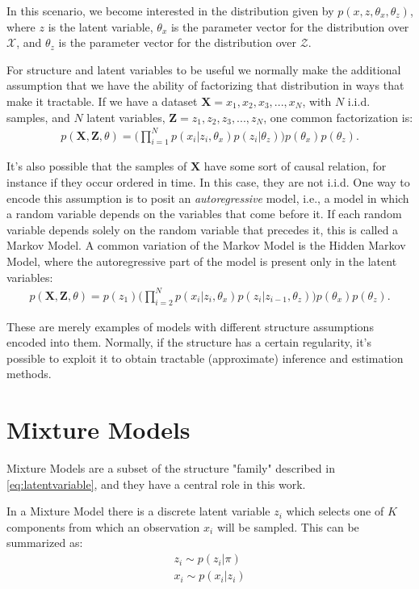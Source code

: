 In this scenario, we become interested in the distribution given by
$p(x, z, \theta_x, \theta_z)$, where $z$ is the latent variable, $\theta_x$ is
the parameter vector for the distribution over $\mathcal{X}$, and $\theta_z$ is
the parameter vector for the distribution over $\mathcal{Z}$.

For structure and latent variables to be useful we normally make the additional
assumption that we have the ability of factorizing that distribution in ways that
make it tractable. If we have a dataset $\mathbf{X} = {x_1, x_2, x_3, ..., x_N}$, with
$N$ i.i.d. samples, and $N$ latent variables, $\mathbf{Z} = {z_1, z_2, z_3, ..., z_N}$,
one common factorization is:
\begin{align}
    p(\mathbf{X}, \mathbf{Z}, \theta) = \Big(\prod^N_{i=1} p(x_i| z_i, \theta_x) p(z_i | \theta_z)\Big) p(\theta_x) p(\theta_z). \label{eq:latentvariable}
\end{align}

It's also possible that the samples of $\mathbf{X}$ have some sort of causal
relation, for instance if they occur ordered in time. In this case, they are not i.i.d.
One way to encode this assumption is to posit an \emph{autoregressive} model, i.e.,
a model in which a random variable depends on the variables that come before it.
If each random variable depends solely on the random variable that precedes it,
this is called a Markov Model. A common variation of the Markov Model is the
Hidden Markov Model, where the autoregressive part of the model is present only
in the latent variables:
\begin{align}
    p(\mathbf{X}, \mathbf{Z}, \theta) = p(z_1) \Big(\prod^N_{i=2} p(x_i | z_i, \theta_x) p(z_i| z_{i-1}, \theta_z) \Big) p(\theta_x) p(\theta_z).
\end{align}

These are merely examples of models with different structure assumptions encoded
into them. Normally, if the structure has a certain regularity, it's possible
to exploit it to obtain tractable (approximate) inference and estimation methods.

\section{Mixture Models}
Mixture Models are a subset of the structure "family" described in \ref{eq:latentvariable},
and they have a central role in this work.

In a Mixture Model there is a discrete latent variable $z_i$ which selects
one of $K$ components from which an observation $x_i$ will be sampled. This
can be summarized as:
\begin{align}
    z_i \sim p(z_i | \pi) \\
    x_i \sim p(x_i | z_i)
\end{align}

